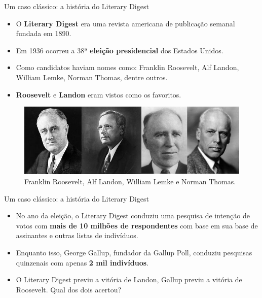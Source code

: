 \documentclass[
  ignorenonframetext,
  serif,
  professionalfont,
  usenames,
  dvipsnames,
  aspectratio = 169]{beamer}
\begin{document}
\begin{frame}{Um caso clássico: a história do Literary Digest}
\label{um-caso-cluxe1ssico-a-histuxf3ria-do-literary-digest}
\begin{itemize}
\item
  O \textbf{Literary Digest} era uma revista americana de publicação
  semanal fundada em 1890.
\item
  Em 1936 ocorreu a 38ª \textbf{eleição presidencial} dos Estados
  Unidos.
\item
  Como candidatos haviam nomes como: Franklin Roosevelt, Alf Landon,
  William Lemke, Norman Thomas, dentre outros.
\item
  \textbf{Roosevelt} e \textbf{Landon} eram vistos como os favoritos.
\end{itemize}

\begin{figure}

{\centering \includegraphics[width=1\linewidth]{./img/1936} 

}

\caption{Franklin Roosevelt, Alf Landon, William Lemke e Norman Thomas.}\label{fig:unnamed-chunk-29}
\end{figure}
\end{frame}

\begin{frame}{Um caso clássico: a história do Literary Digest}
\label{um-caso-cluxe1ssico-a-histuxf3ria-do-literary-digest-1}
\begin{itemize}
\item
  No ano da eleição, o Literary Digest conduziu uma pesquisa de intenção
  de votos com \textbf{mais de 10 milhões de respondentes} com base em
  sua base de assinantes e outras listas de indivíduos.
\item
  Enquanto isso, George Gallup, fundador da Gallup Poll, conduziu
  pesquisas quinzenais com apenas \textbf{2 mil indivíduos}.
\item
  O Literary Digest previu a vitória de Landon, Gallup previu a vitória
  de Roosevelt. Qual dos dois acertou?
\end{itemize}
\end{frame}
\end{document}
